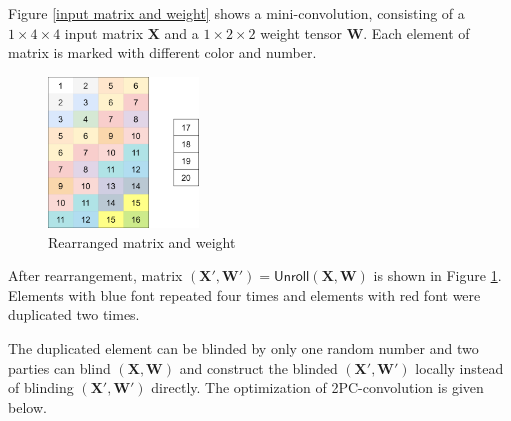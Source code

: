 \documentclass[letterpaper]{article} %
\begin{document}
    Figure \ref{input matrix and weight} shows a mini-convolution,
    consisting of a $1\times 4\times 4$ input matrix $\mathbf{X}$  and a $1\times 2\times 2$ weight tensor $\mathbf{W}$.
    Each element of matrix is marked with different color and number.
    \begin{figure}[htbp]
        \centering
        \includegraphics[width=4cm]{new_unrolling2.png}
        \caption{Rearranged matrix and weight}
        \label{rearrangement of matrix and weight}
    \end{figure}

    After rearrangement, matrix $(\mathbf{X}',\mathbf{W}')=\mathsf{Unroll}(\mathbf{X},\mathbf{W})$
    is shown in Figure \ref{rearrangement of matrix and weight}.
    Elements with blue font repeated four times
    and elements with red font were duplicated two times.

    The duplicated element can be blinded by only one random number
    and two parties can  blind $(\mathbf{X},\mathbf{W})$ and
    construct the blinded $(\mathbf{X}',\mathbf{W}')$ locally instead of blinding $(\mathbf{X}',\mathbf{W}')$ directly.
    The optimization of 2PC-convolution is given below.
\end{document}
